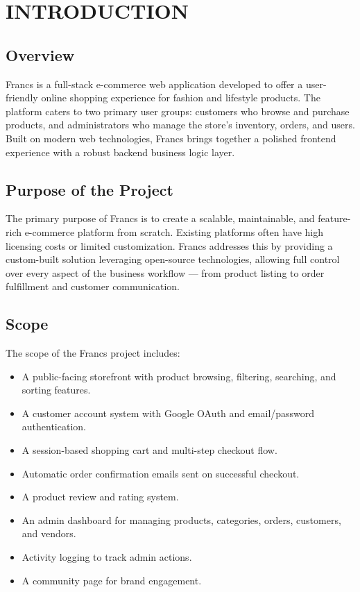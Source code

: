 \chapter{INTRODUCTION}

\section{Overview}
Francs is a full-stack e-commerce web application developed to offer a user-friendly online shopping experience for fashion and lifestyle products. The platform caters to two primary user groups: customers who browse and purchase products, and administrators who manage the store's inventory, orders, and users. Built on modern web technologies, Francs brings together a polished frontend experience with a robust backend business logic layer.

\section{Purpose of the Project}
The primary purpose of Francs is to create a scalable, maintainable, and feature-rich e-commerce platform from scratch. Existing platforms often have high licensing costs or limited customization. Francs addresses this by providing a custom-built solution leveraging open-source technologies, allowing full control over every aspect of the business workflow --- from product listing to order fulfillment and customer communication.

\section{Scope}
The scope of the Francs project includes:
\begin{itemize}
    \item A public-facing storefront with product browsing, filtering, searching, and sorting features.
    \item A customer account system with Google OAuth and email/password authentication.
    \item A session-based shopping cart and multi-step checkout flow.
    \item Automatic order confirmation emails sent on successful checkout.
    \item A product review and rating system.
    \item An admin dashboard for managing products, categories, orders, customers, and vendors.
    \item Activity logging to track admin actions.
    \item A community page for brand engagement.
\end{itemize}

